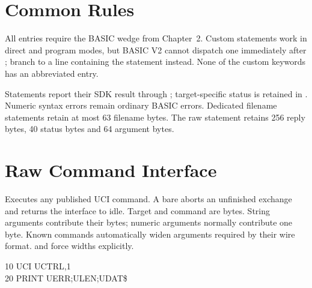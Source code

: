 

\begin{referencechapter}

\section{Common Rules}

All entries require the BASIC wedge from Chapter~2. Custom statements work in
direct and program modes, but BASIC V2 cannot dispatch one immediately after
; branch to a line containing the statement instead. None of the
custom keywords has an abbreviated entry.

Statements report their SDK result through ; target-specific status
is retained in . Numeric syntax errors remain ordinary BASIC errors.
Dedicated filename statements retain at most 63 filename bytes. The raw
 statement retains 256 reply bytes, 40 status bytes and 64 argument
bytes.

\section{Raw Command Interface}




Executes any published UCI command. A bare  aborts an unfinished
exchange and returns the interface to idle. Target and command are bytes.
String arguments contribute their bytes; numeric arguments normally contribute
one byte. Known commands automatically widen arguments required by their wire
format.  and  force widths explicitly.


\begin{screen}
10 UCI UCTRL,1\\
20 PRINT UERR;ULEN;UDAT\$
\end{screen}


\end{referencechapter}
